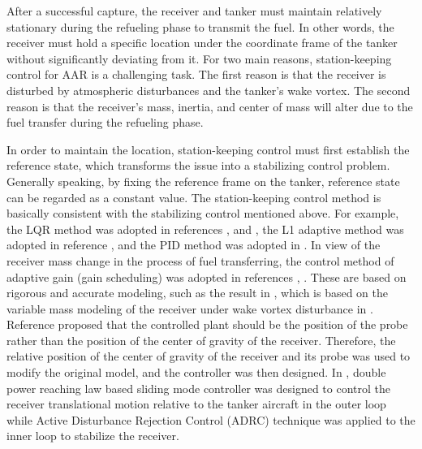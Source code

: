 After a successful capture, the receiver and tanker must maintain
relatively stationary during the refueling phase to transmit the fuel.
In other words, the receiver must hold a specific location under the
coordinate frame of the tanker without significantly deviating from
it. For two main reasons, station-keeping control for AAR is a challenging
task. The first reason is that the receiver is disturbed by atmospheric
disturbances and the tanker's wake vortex. The second reason is that
the receiver's mass, inertia, and center of mass will alter due to
the fuel transfer during the refueling phase.

In order to maintain the location, station-keeping control must first
establish the reference state, which transforms the issue into a stabilizing
control problem. Generally speaking, by fixing the reference frame
on the tanker, reference state can be regarded as a constant value.
The station-keeping control method is basically consistent with the
stabilizing control mentioned above. For example, the LQR method was
adopted in references \cite{dogan2009effects}, \cite{elliott2009improving}
and \cite{lee2013estimation}, the L1 adaptive method was adopted
in reference \cite{wang2010verifiable}, and the PID method was adopted
in \cite{ross2006autonomous}. In view of the receiver mass change
in the process of fuel transferring, the control method of adaptive
gain (gain scheduling) was adopted in references \cite{wang2010verifiable},
\cite{dogan2009effects}. These are based on rigorous and accurate
modeling, such as the result in \cite{dogan2009effects}, which is
based on the variable mass modeling of the receiver under wake vortex
disturbance in \cite{Waishek2009Derivation}. Reference \cite{kriel2013receptacle}
proposed that the controlled plant should be the position of the probe
rather than the position of the center of gravity of the receiver.
Therefore, the relative position of the center of gravity of the receiver
and its probe was used to modify the original model, and the controller
was then designed. In \cite{an2018relative}, double power reaching
law based sliding mode controller was designed to control the receiver
translational motion relative to the tanker aircraft in the outer
loop while Active Disturbance Rejection Control (ADRC) technique was
applied to the inner loop to stabilize the receiver. 

